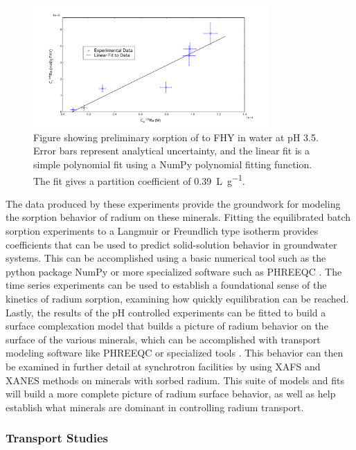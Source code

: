 \documentclass[twoside,12pt,titlepage]{article}
\newcommand{\isotope}[2]{\ch{^{#1}#2}}
\begin{document}
\begin{figure}
	\centering
	\includegraphics[width=0.8\textwidth]{AGU2014FHYRa.pdf}
	\caption{Figure showing preliminary sorption of \isotope{226}{Ra} to FHY in water at pH \num{3.5}. Error bars represent analytical uncertainty, and the linear fit is a simple polynomial fit using a NumPy polynomial fitting function. The fit gives a partition coefficient of \SI{0.39}{\liter\per\gram}.}
	\label{fig:RaFHYSorb}
\end{figure}

\par The data produced by these experiments provide the groundwork for modeling the sorption behavior of radium on these minerals. Fitting the equilibrated batch sorption experiments to a Langmuir or Freundlich type isotherm provides coefficients that can be used to predict solid-solution behavior in groundwater systems. This can be accomplished using a basic numerical tool such as the python package NumPy or more specialized software such as PHREEQC \cite{PHREEQC}. The time series experiments can be used to establish a foundational sense of the kinetics of radium sorption, examining how quickly equilibration can be reached. Lastly, the results of the pH controlled experiments can be fitted to build a surface complexation model that builds a picture of radium behavior on the surface of the various minerals, which can be accomplished with transport modeling software like PHREEQC or specialized tools \cite{Dixit2003}. This behavior can then be examined in further detail at synchrotron facilities by using XAFS and XANES methods on minerals with sorbed radium. This suite of models and fits will build a more complete picture of radium surface behavior, as well as help establish what minerals are dominant in controlling radium transport.

\subsubsection{Transport Studies}
\end{document}
